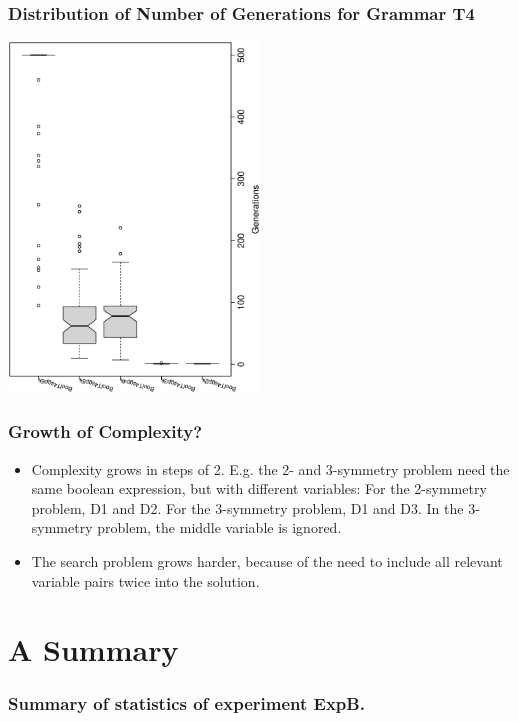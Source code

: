 \documentclass[18pt,c]{beamer}
\makeatletter
\let\beamer@writeslidentry@miniframeson=\beamer@writeslidentry
\newcommand*{\miniframeson}{\let\beamer@writeslidentry=\beamer@writeslidentry@miniframeson}
\makeatother
\begin{document}
 \begin{frame}
 \frametitle{ Distribution of Number of Generations for Grammar T4 }
 \begin{center}
\includegraphics[width=0.5\textwidth, angle=-90]
{ExpBboxplottGenerations009.eps}
 \end{center}
 \label{ExpBboxplottGenerations009.eps}  
 \end{frame}

\begin{frame}
\frametitle{
Growth of Complexity?
}
\begin{itemize}
\item Complexity grows in steps of 2.
       E.g. the 2- and 3-symmetry problem need the same boolean expression,
       but with different variables:
       For the 2-symmetry problem, D1 and D2.
       For the 3-symmetry problem, D1 and D3.
In the 3-symmetry problem, the middle variable is ignored.
\item The search problem grows harder, because of the need to include all 
       relevant variable pairs twice into the solution.
\end{itemize}
\end{frame}%
\miniframeson
\section{A Summary}
 \begin{frame}
 \fontsize{8pt}{9pt}\selectfont
 \frametitle{ Summary of statistics of experiment ExpB. }

 \label{ExpBStatsTable000.tex}  
 \end{frame}
\end{document}
